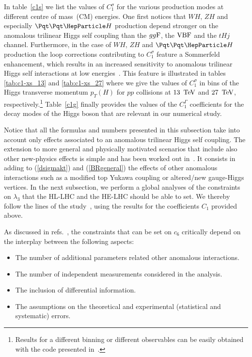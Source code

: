 In table~\ref{c1s} we list the values of $C_1^{\sigma}$ for the various production modes at different centre of mass~(CM) energies. One first notices that ${WH}$, ${ZH}$ and especially ${\tth}$ production depend stronger on the anomalous trilinear Higgs self coupling than the $gg{\rm F}$, the ${\rm VBF}$ and the $t H j$ channel.  Furthermore, in the case of ${WH}$, ${ZH}$  and ${\tth}$ production the loop corrections contributing to $C_1^{\sigma}$ feature a Sommerfeld enhancement, which results in an increased sensitivity to anomalous trilinear Higgs self interactions at low energies~\cite{Degrassi:2016wml,Bizon:2016wgr,Maltoni:2017ims}. This feature is illustrated in tables \ref{tab:c1-xs_13} and \ref{tab:c1-xs_27} where we give  the values of $C_1^{\sigma}$ in bins of the Higgs transverse momentum $p_T(H)$  for $pp$ collisions at $13 \, {\rm ~\text{TeV}}$ and $27 \, {\rm ~\text{TeV}}$, respectively.\footnote{Results for a different binning or different observables can be easily obtained with the code presented in~\cite{Maltoni:2017ims}.} Table~\ref{c1g} finally provides the values of  the $C_1^{\Gamma}$ coefficients for the decay modes of the Higgs boson that are relevant in our numerical study. 

Notice that all the formulas and numbers presented in this subsection take into account only  effects associated to an anomalous trilinear Higgs self coupling. The extension to more general and physically motivated scenarios that include also other new-physics effects is simple and has been worked out in~\cite{DiVita:2017eyz,Maltoni:2017ims}. It consists in adding to  (\ref{dsigmakt}) and (\ref{BRgeneral}) the effects of other anomalous  interactions such as a modified top Yukawa coupling or altered/new gauge-Higgs vertices. In the next subsection, we perform a global analyses of the constraints on $\lambda_3$ that the HL-LHC and the HE-LHC should be able to set.    We thereby follow the  lines of the study~\cite{DiVita:2017eyz}, using the results for the coefficients $C_1$ provided above.




 As discussed in refs.~\cite{Maltoni:2017ims, DiVita:2017eyz}, the constraints  that can be set on $c_6$ critically depend on the interplay between the following aspects:
\begin{itemize}
\item The number of additional parameters related other anomalous interactions.
\item The number of independent measurements considered in the analysis.
\item The inclusion of differential information.
\item The assumptions on the theoretical and experimental (statistical and systematic) errors.
\end{itemize}
   
